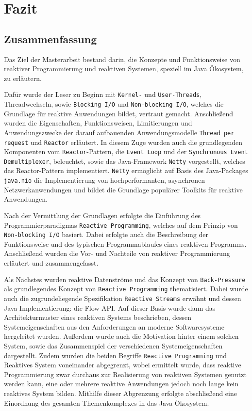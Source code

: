 \section{Fazit}
\label{sec:fazit}
\subsection{Zusammenfassung}
\label{subsec:zusammenfassung}
Das Ziel der Masterarbeit bestand darin, die Konzepte und Funktionsweise von reaktiver Programmierung und reaktiven Systemen, speziell im Java Ökosystem,
zu erläutern.

Dafür wurde der Leser zu Beginn mit \verb|Kernel-| und \verb|User-Threads|,
Threadwechseln, sowie \verb|Blocking I/O| und \verb|Non-blocking I/O|, welches die Grundlage
für reaktive Anwendungen bildet, vertraut gemacht.
Anschließend wurden die Eigenschaften, Funktionsweisen, Limitierungen und Anwendungszwecke der darauf aufbauenden Anwendungsmodelle
\verb|Thread per request| und \verb|Reactor| erläutert. In diesem Zuge wurden auch die grundlegenden Komponenten vom \verb|Reactor|-Pattern,
die \verb|Event Loop| und der \verb|Synchronous Event Demultiplexer|, beleuchtet, sowie das Java-Framework \verb|Netty| vorgestellt, welches
das Reactor-Pattern implementiert.
\verb|Netty| ermöglicht auf Basis des Java-Packages \verb|java.nio| die Implementierung von
hochperformanten, asynchronen Netzwerkanwendungen und bildet die Grundlage populärer Toolkits für reaktive Anwendungen.\newline

Nach der Vermittlung der Grundlagen erfolgte die Einführung des Programmierparadigmas \verb|Reactive Programming|, welches
auf dem Prinzip von \verb|Non-blocking I/O| basiert. Dabei erfolgte auch die Beschreibung der Funktionsweise und des typischen Programmablaufes
eines reaktiven Programms.
Anschließend wurden die Vor- und Nachteile von reaktiver Programmierung erläutert und zusammengefasst.

Als Nächstes wurden reaktive Datenströme und das Konzept von \verb|Back-Pressure| als grundlegendes Konzept von \verb|Reactive Programming|
thematisiert. Dabei wurde auch die zugrundeliegende Spezifikation \verb|Reactive Streams| erwähnt und dessen Java-Implementierung: die Flow-API.
Auf dieser Basis wurde dann das Architekturmuster eines reaktiven Systems beschrieben, dessen Systemeigenschaften aus den
Anforderungen an moderne Softwaresysteme hergeleitet wurden. Außerdem wurde auch die Motivation hinter einem solchen System, sowie
das Zusammenspiel der verschiedenen Systemeigenschaften dargestellt. Zudem wurden die beiden Begriffe \verb|Reactive Programming| und Reaktives System
voneinander abgegrenzt, wobei ermittelt wurde, dass reaktive Programmierung zwar durchaus zur Realisierung von reaktiven Systemen genutzt werden kann,
eine oder mehrere reaktive Anwendungen jedoch noch lange kein reaktives System bilden.
Mithilfe dieser Abgrenzung erfolgte abschließend eine Einordnung des gesamten Themenkomplexes in das Java Ökosystem.

